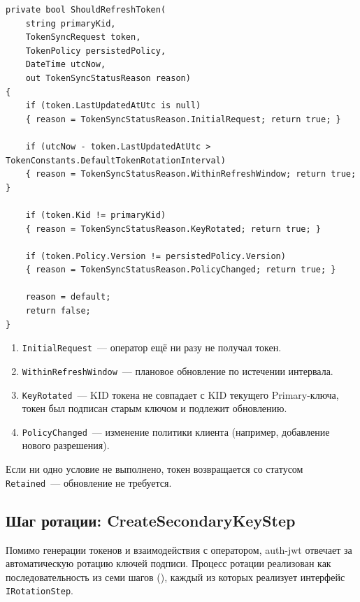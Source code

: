 \begin{lstlisting}[language={[Sharp]C}]
private bool ShouldRefreshToken(
    string primaryKid,
    TokenSyncRequest token,
    TokenPolicy persistedPolicy,
    DateTime utcNow,
    out TokenSyncStatusReason reason)
{
    if (token.LastUpdatedAtUtc is null)
    { reason = TokenSyncStatusReason.InitialRequest; return true; }

    if (utcNow - token.LastUpdatedAtUtc > TokenConstants.DefaultTokenRotationInterval)
    { reason = TokenSyncStatusReason.WithinRefreshWindow; return true; }

    if (token.Kid != primaryKid)
    { reason = TokenSyncStatusReason.KeyRotated; return true; }

    if (token.Policy.Version != persistedPolicy.Version)
    { reason = TokenSyncStatusReason.PolicyChanged; return true; }

    reason = default;
    return false;
}
\end{lstlisting}

\begin{enumerate}
  \item \texttt{InitialRequest}~--- оператор ещё ни разу не получал токен.
  \item \texttt{WithinRefreshWindow}~--- плановое обновление по истечении интервала.
  \item \texttt{KeyRotated}~--- KID токена не совпадает с KID текущего Primary-ключа,
    токен был подписан старым ключом и подлежит обновлению.
  \item \texttt{PolicyChanged}~--- изменение политики клиента
    (например, добавление нового разрешения).
\end{enumerate}

Если ни одно условие не выполнено,
токен возвращается со статусом \texttt{Retained}~--- обновление не требуется.

\subsection{Шаг ротации: CreateSecondaryKeyStep}\label{subsec:rotation-step-impl}

Помимо генерации токенов и взаимодействия с оператором,
auth-jwt отвечает за автоматическую ротацию ключей подписи.
Процесс ротации реализован как последовательность
из семи шагов (),
каждый из которых реализует интерфейс \texttt{IRotationStep}.

